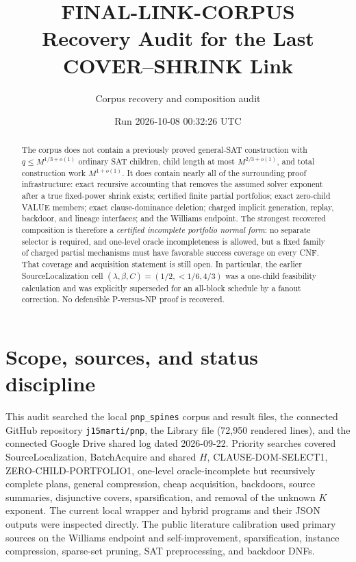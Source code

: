 \documentclass[10pt]{article}
\title{FINAL-LINK-CORPUS\\
Recovery Audit for the Last COVER--SHRINK Link}
\author{Corpus recovery and composition audit}
\date{Run 2026-10-08 00:32:26 UTC}
\begin{document}
\maketitle

\begin{abstract}
The corpus does not contain a previously proved general-SAT construction with
$q\le M^{1/3+o(1)}$ ordinary SAT children, child length at most
$M^{2/3+o(1)}$, and total construction work $M^{1+o(1)}$.  It does contain
nearly all of the surrounding proof infrastructure: exact recursive
accounting that removes the assumed solver exponent after a true fixed-power
shrink exists; certified finite partial portfolios; exact zero-child VALUE
members; exact clause-dominance deletion; charged implicit generation,
replay, backdoor, and lineage interfaces; and the Williams endpoint.  The
strongest recovered composition is therefore a \emph{certified incomplete
portfolio normal form}: no separate selector is required, and one-level
oracle incompleteness is allowed, but a fixed family of charged partial
mechanisms must have favorable success coverage on every CNF.  That coverage
and acquisition statement is still open.  In particular, the earlier
SourceLocalization cell $(\lambda,\beta,C)=(1/2,<1/6,4/3)$ was a one-child
feasibility calculation and was explicitly superseded for an all-block
schedule by a fanout correction.  No defensible P-versus-NP proof is recovered.
\end{abstract}

\section{Scope, sources, and status discipline}

This audit searched the local \texttt{pnp\_spines} corpus and result files,
the connected GitHub repository \texttt{j15marti/pnp}, the Library file
 (72,950 rendered lines), and
the connected Google Drive shared log dated 2026-09-22.  Priority searches
covered SourceLocalization, BatchAcquire and shared $H$,
CLAUSE-DOM-SELECT1, ZERO-CHILD-PORTFOLIO1, one-level oracle-incomplete but
recursively complete plans, general compression, cheap
acquisition, backdoors, source summaries, disjunctive covers, sparsification,
and removal of the unknown $K$ exponent.  The current local wrapper and hybrid
programs and their JSON outputs were inspected directly.  The public
literature calibration used primary sources on the Williams endpoint and
self-improvement, sparsification, instance compression, sparse-set pruning,
SAT preprocessing, and backdoor DNFs.
\end{document}
